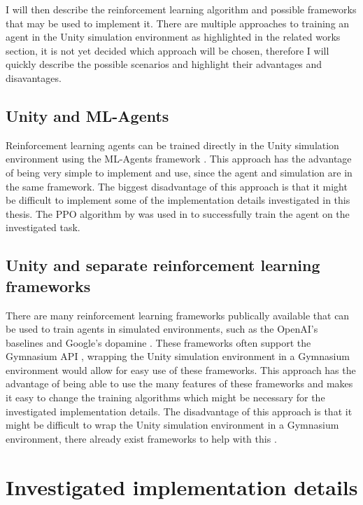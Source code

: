 I will then describe the reinforcement learning algorithm and possible frameworks that may be used to implement it. There are multiple approaches to training an agent in the Unity simulation environment as highlighted in the related works section, it is not yet decided which approach will be chosen, therefore I will quickly describe the possible scenarios and highlight their advantages and disavantages.

\subsection*{Unity and ML-Agents}

Reinforcement learning agents can be trained directly in the Unity simulation environment using the ML-Agents framework \autocite{mlagents}. This approach has the advantage of being very simple to implement and use, since the agent and simulation are in the same framework. The biggest disadvantage of this approach is that it might be difficult to implement some of the implementation details investigated in this thesis. %
The PPO algorithm by \autocite{mlagents} was used in \autocite{maximilian} to successfully train the agent on the investigated task.

\subsection*{Unity and separate reinforcement learning frameworks}

There are many reinforcement learning frameworks publically available that can be used to train agents in simulated environments, such as the OpenAI's baselines \autocite{sb3} and Google's dopamine \autocite{dopamine}. These frameworks often support the Gymnasium API \autocite{gymnasium}, wrapping the Unity simulation environment in a Gymnasium environment would allow for easy use of these frameworks. This approach has the advantage of being able to use the many features of these frameworks and makes it easy to change the training algorithms which might be necessary for the investigated implementation details. The disadvantage of this approach is that it might be difficult to wrap the Unity simulation environment in a Gymnasium environment, there already exist frameworks to help with this \autocite{peacefulpie}.





\section{Investigated implementation details}

